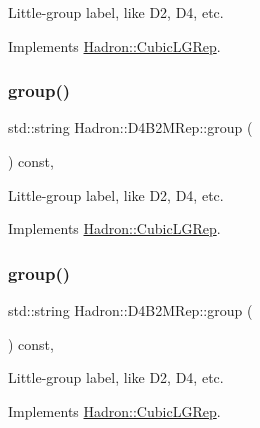 Little-\/group label, like D2, D4, etc. 

Implements \mbox{\hyperlink{structHadron_1_1CubicLGRep_a9bdb14b519a611d21379ed96a3a9eb41}{Hadron\+::\+Cubic\+L\+G\+Rep}}.

\mbox{\label{structHadron_1_1D4B2MRep_a46c379ad06e057f5ca60549e8a373d01}} 
\subsubsection{\texorpdfstring{group()}{group()}\hspace{0.1cm}{\footnotesize\ttfamily [2/3]}}
{\footnotesize\ttfamily std\+::string Hadron\+::\+D4\+B2\+M\+Rep\+::group (\begin{DoxyParamCaption}{ }\end{DoxyParamCaption}) const\hspace{0.3cm}{\ttfamily [inline]}, {\ttfamily [virtual]}}

Little-\/group label, like D2, D4, etc. 

Implements \mbox{\hyperlink{structHadron_1_1CubicLGRep_a9bdb14b519a611d21379ed96a3a9eb41}{Hadron\+::\+Cubic\+L\+G\+Rep}}.

\mbox{\label{structHadron_1_1D4B2MRep_a46c379ad06e057f5ca60549e8a373d01}} 
\subsubsection{\texorpdfstring{group()}{group()}\hspace{0.1cm}{\footnotesize\ttfamily [3/3]}}
{\footnotesize\ttfamily std\+::string Hadron\+::\+D4\+B2\+M\+Rep\+::group (\begin{DoxyParamCaption}{ }\end{DoxyParamCaption}) const\hspace{0.3cm}{\ttfamily [inline]}, {\ttfamily [virtual]}}

Little-\/group label, like D2, D4, etc. 

Implements \mbox{\hyperlink{structHadron_1_1CubicLGRep_a9bdb14b519a611d21379ed96a3a9eb41}{Hadron\+::\+Cubic\+L\+G\+Rep}}.

\mbox{\label{structHadron_1_1D4B2MRep_ab0c418e49af7e2b749597e7b255d93f9}} 
